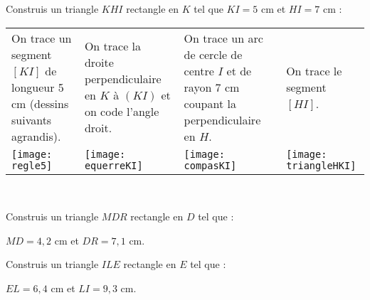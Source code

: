 
\begin{methode*1}

\begin{exemple*1}
Construis un triangle $KHI$ rectangle en $K$ tel que $KI = 5$ cm et $HI = 7$ cm : \\[1em]
\begin{tabularx}{\textwidth}{X|X|X|X}
 On trace un segment $[KI]$ de longueur 5 cm (dessins suivants agrandis). & On trace la droite perpendiculaire en $K$ à $(KI)$ et on code l'angle droit. & On trace un arc de cercle de centre $I$ et de rayon 7 cm coupant la perpendiculaire en $H$. & On trace le segment $[HI]$.\\
 \texttt{[image: regle5]} & \texttt{[image: equerreKI]} & \texttt{[image: compasKI]} & \texttt{[image: triangleHKI]} \\ 
\end{tabularx} \\

\end{exemple*1}

\exercice 
Construis un triangle $MDR$ rectangle en $D$ tel que :

$MD = 4,2$ cm et $DR = 7,1$ cm. 
\vspace{4cm}
 
\exercice
Construis un triangle $ILE$ rectangle en $E$ tel que :

$EL = 6,4$ cm et $LI = 9,3$ cm.
\vspace{2cm}
 
\end{methode*1}


